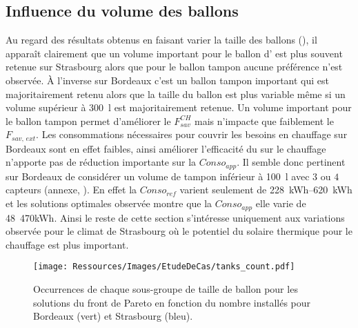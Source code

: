\subsection{Influence du volume des ballons} %
\label{sub:influence_du_volume_des_ballons}
Au regard des résultats obtenus en faisant varier la taille des ballons
(), il apparaît clairement que un volume important
pour le ballon d’ est plus souvent retenue sur Strasbourg alors que pour le
ballon tampon aucune préférence n’est observée. À l’inverse sur Bordeaux c’est un ballon
tampon important qui est majoritairement retenu alors que la taille du ballon 
est plus variable même si un volume supérieur à \SI{300}{\litre} est majoritairement
retenue. Un volume important pour le ballon tampon permet d’améliorer le $F_{sav}^{CH}$
mais n’impacte que faiblement le $F_{sav,\, ext}$. Les consommations nécessaires pour
couvrir les besoins en chauffage sur Bordeaux sont en effet faibles, ainsi améliorer
l’efficacité du  sur le chauffage n’apporte pas de réduction importante sur la
$Conso_{app}$. Il semble donc pertinent sur Bordeaux de considérer un volume de tampon
inférieur à \SI{100}{\litre} avec $3$ ou $4$ capteurs (annexe, ).
En effet la $Conso_{ref}$ varient seulement de \SIrange{228}{620}{kWh} et les solutions
optimales observée montre que la $Conso_{app}$ elle varie de \SI{48}{470}{kWh}. Ainsi le
reste de cette section s’intéresse uniquement aux variations observée pour le climat de
Strasbourg où le potentiel du solaire thermique pour le chauffage est plus important.

\begin{figure}
    \centering
    \texttt{[image: Ressources/Images/EtudeDeCas/tanks\_count.pdf]}
    \caption[Occurrences de chaque sous-groupe de taille de ballon pour les solutions du front de Pareto]
             {Occurrences de chaque sous-groupe de taille de ballon pour les solutions du front de Pareto
              en fonction du nombre installés pour Bordeaux (vert) et Strasbourg (bleu).}
    \label{fig:occurence_taille_ballons}
\end{figure}

